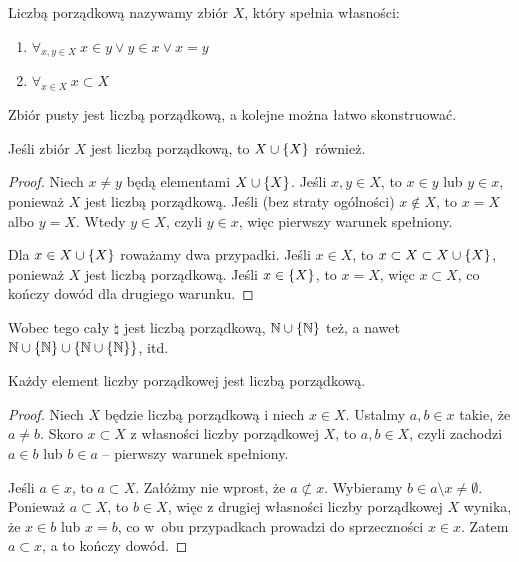 \begin{definition}
    Liczbą porządkową nazywamy zbiór \( X \), który spełnia własności:
    \begin{enumerate}
        \item \( \forall_{x, y \in X} \ x \in y \lor y \in x \lor x = y \)
        \item \( \forall_{x \in X} \ x \subset X \)
    \end{enumerate}
\end{definition}
Zbiór pusty jest liczbą porządkową, a kolejne można łatwo skonstruować.

\begin{theorem}
    Jeśli zbiór \( X \) jest liczbą porządkową, to \( X \cup \set{X} \) również.
\end{theorem}
\begin{proof}
    Niech \( x \neq y \) będą elementami \( X \cup \set{X} \). Jeśli \( x, y \in X \), to \( x \in y \) lub \( y \in x \), ponieważ \( X \) jest liczbą porządkową.
    Jeśli (bez straty ogólności) \( x \notin X \), to \( x = X \) albo \( y = X \). Wtedy \( y \in X \), czyli \( y \in x \), więc pierwszy warunek spełniony.

    Dla \( x \in X \cup \set{X} \) roważamy dwa przypadki. Jeśli \( x \in X \), to \( x \subset X \subset X \cup \set{X} \), ponieważ \( X \) jest liczbą porządkową.
    Jeśli \( x \in \set{X} \), to \( x = X \), więc \( x \subset X \), co kończy dowód dla drugiego warunku.
\end{proof}
Wobec tego cały \( \natural \) jest liczbą porządkową, \( \natural \cup \set{\natural} \) też, a nawet \( \natural \cup \set{\natural} \cup \set{\natural \cup \set{\natural}} \), itd.

\begin{theorem}
    Każdy element liczby porządkowej jest liczbą porządkową.
\end{theorem}
\begin{proof}
    Niech \( X \) będzie liczbą porządkową i niech \( x \in X \). Ustalmy \( a, b \in x \) takie, że \( a \neq b \). Skoro \( x \subset X \) z własności liczby porządkowej \( X \), to \( a, b \in X \),
    czyli zachodzi \( a \in b \) lub \( b \in a \) -- pierwszy warunek spełniony.

    Jeśli \( a \in x \), to \( a \subset X \). Załóżmy nie wprost, że \( a \not\subset x \). Wybieramy \( b \in a \setminus x \neq \emptyset \). Ponieważ \( a \subset X \), to \( b \in X \),
    więc z drugiej własności liczby porządkowej \( X \) wynika, że \( x \in b \) lub \( x = b\), co w~obu przypadkach prowadzi do sprzeczności \( x \in x \). Zatem \( a \subset x \), a to kończy dowód.
\end{proof}

